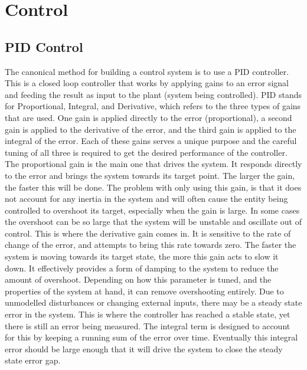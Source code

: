 \documentclass[letterpaper,12pt,titlepage,oneside,final]{book}
\begin{document}
\chapter{Control} \label{chap:control}

\section{PID Control}


The canonical method for building a control system is to use a PID controller. 
This is a closed loop controller that works by applying gains to an error signal and feeding the result as input to the plant (system being controlled). 
PID stands for Proportional, Integral, and Derivative, which refers to the three types of gains that are used. 
One gain is applied directly to the error (proportional), a second gain is applied to the derivative of the error, and the third gain is applied to the integral of the error. 
Each of these gains serves a unique purpose and the careful tuning of all three is required to get the desired performance of the controller. 
The proportional gain is the main one that drives the system. 
It responds directly to the error and brings the system towards its target point. 
The larger the gain, the faster this will be done. 
The problem with only using this gain, is that it does not account for any inertia in the system and will often cause the entity being controlled to overshoot its target, especially when the gain is large. 
In some cases the overshoot can be so large that the system will be unstable and oscillate out of control. This is where the derivative gain comes in. 
It is sensitive to the rate of change of the error, and attempts to bring this rate towards zero. 
The faster the system is moving towards its target state, the more this gain acts to slow it down. 
It effectively provides a form of damping to the system to reduce the amount of overshoot.
Depending on how this parameter is tuned, and the properties of the system at hand, it can remove overshooting entirely. 
Due to unmodelled disturbances or changing external inputs, there may be a steady state error in the system. 
This is where the controller has reached a stable state, yet there is still an error being measured. 
The integral term is designed to account for this by keeping a running sum of the error over time. 
Eventually this integral error should be large enough that it will drive the system to close the steady state error gap.
\end{document}
